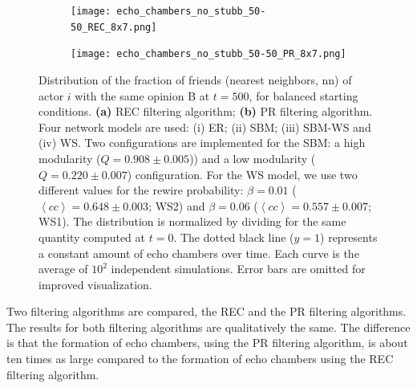 \documentclass[11 pt , letterpaper , twoside , openright]{book}
\begin{document}
\begin{figure}[H]
  \begin{subfigure}[b]{0.49\textwidth}
    \caption{}
  	\texttt{[image: echo\_chambers\_no\_stubb\_50-50\_REC\_8x7.png]}
      \end{subfigure}
  \begin{subfigure}[b]{0.49\textwidth}
    \caption{}
  	\texttt{[image: echo\_chambers\_no\_stubb\_50-50\_PR\_8x7.png]}
  \end{subfigure}
  \captionsetup{format=plain}
  \caption[Distribution of the fraction of friends (nearest neighbors, nn) of actor $i$ with the same opinion B at $t=500$, $\left<P_{\text{B}}^{\text{nn}}\right>$, for balanced starting conditions.]{Distribution of the fraction of friends (nearest neighbors, nn) of actor $i$ with the same opinion B at $t = 500$, for balanced starting conditions. \textbf{(a)} REC filtering algorithm; \textbf{(b)} PR filtering algorithm. Four network models are used: (i) ER; (ii) SBM; (iii) SBM-WS and (iv) WS. Two configurations are implemented for the SBM: a high modularity ($Q = 0.908 \pm 0.005$)) and a low modularity ($Q = 0.220 \pm 0.007$) configuration. For the WS model, we use two different values for the rewire probability: $\beta = 0.01$ ($\left<cc\right> = 0.648 \pm 0.003$; WS2) and $\beta = 0.06$ ($\left<cc\right> = 0.557 \pm 0.007$; WS1). The distribution is normalized by dividing for the same quantity computed at $t=0$. The dotted black line ($y=1$) represents a constant amount of echo chambers over time. Each curve is the average of $10^2$ independent simulations. Error bars are omitted for improved visualization.}
\label{echo_50_50}
\end{figure}
\noindent
Two filtering algorithms are compared, the REC and the PR filtering algorithms. The results for both filtering algorithms are qualitatively the same. The difference is that the formation of echo chambers, using the PR filtering algorithm, is about ten times as large compared to the formation of echo chambers using the REC filtering algorithm. \\
\newline
\end{document}
